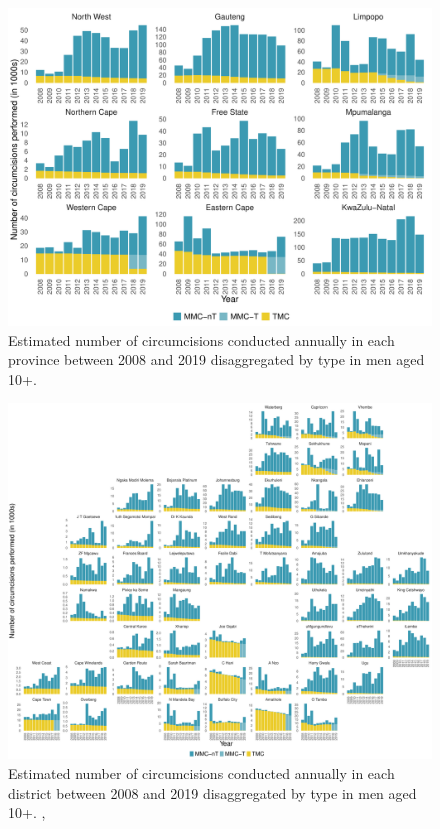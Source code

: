 \documentclass{article}
\begin{document}
\begin{appendix}
\begin{figure}[H]
	\centering
	\includegraphics[width = \linewidth]{Figures/suppmat/VMMCs/MCsPerformed_Province}
	\caption{Estimated number of circumcisions conducted annually in each province between 2008 and 2019 disaggregated by type in men aged 10+.}
\end{figure}	


\begin{figure}[H]
	\centering
	\includegraphics[width = \linewidth]{Figures/suppmat/VMMCs/MCsPerformed_District}
	\caption{Estimated number of circumcisions conducted annually in each district between 2008 and 2019 disaggregated by type in men aged 10+. ,}
\end{figure}


\end{appendix}
\end{document}
